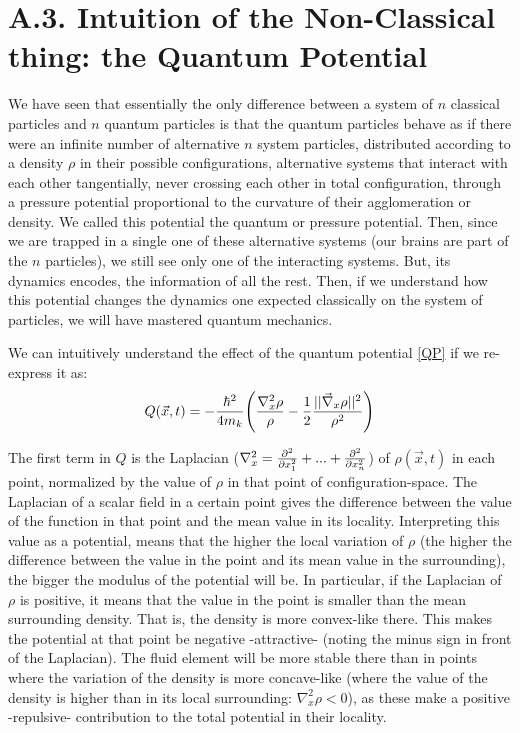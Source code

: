 \documentclass[11pt, a4paper]{article} %
\begin{document}
\section*{A.3. Intuition of the Non-Classical thing: the Quantum Potential}
We have seen that essentially the only difference between a system of $n$ classical particles and $n$ quantum particles is that the quantum particles behave as if there were an infinite number of alternative $n$ system particles, distributed according to a density $\rho$ in their possible configurations, alternative systems that interact with each other tangentially, never crossing each other in total configuration, through a pressure potential proportional to the curvature of their agglomeration or density. We called this potential the quantum or pressure potential. Then, since we are trapped in a single one of these alternative systems (our brains are part of the $n$ particles), we still see only one of the interacting systems. But, its dynamics encodes, the information of all the rest. Then, if we understand how this potential changes the dynamics one expected classically on the system of particles, we will have mastered quantum mechanics.

We can intuitively understand the effect of the quantum potential \eqref{QP} if we re-express it as:
\begin{equation}\label{Q2}
Q(\vec{x},t) = -\frac{\hbar^2}{4m_k }\qty(\frac{\nabla_x^2\rho}{\rho} -\frac{1}{2}\frac{\qty||\vec{\nabla}_x \rho||^2}{\rho^2})\vspace{-0.2cm}
\end{equation}

The first term in $Q$ is the Laplacian ($\nabla_x^2 = \pdv[2]{}{x_1}+...+\pdv[2]{}{x_n}$) of $\rho(\vec{x},t)$ in each point, normalized by the value of $\rho$ in that point of configuration-space. The Laplacian of a scalar field in a certain point gives the difference between the value of the function in that point and the mean value in its locality. Interpreting this value as a potential, means that the higher the local variation of $\rho$ (the higher the difference between the value in the point and its mean value in the surrounding), the bigger the modulus of the potential will be. In particular, if the Laplacian of $\rho$ is positive, it means that the value in the point is smaller than the mean surrounding density. That is, the density is more convex-like there. This makes the potential at that point be negative -attractive- (noting the minus sign in front of the Laplacian). The fluid element will be more stable there than in points where the variation of the density is more concave-like (where the value of the density is higher than in its local surrounding: $\nabla_x^2 \rho<0$), as these make a positive -repulsive- contribution to the total potential in their locality.
\end{document}
